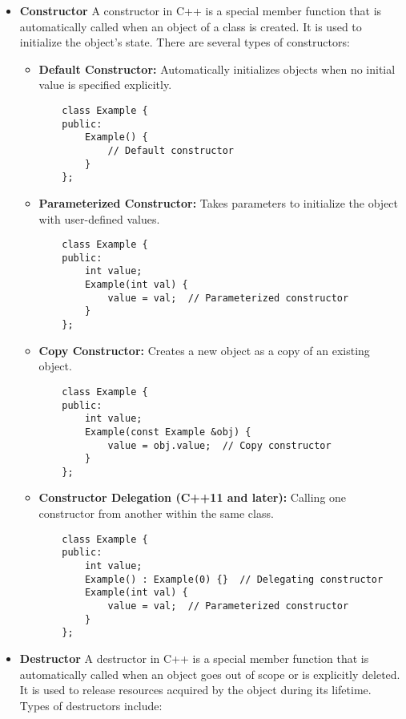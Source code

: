 \begin{itemize}
\item \textbf{Constructor} A constructor in C++ is a special member function that is automatically called when an object of a class is created. It is used to initialize the object's state. There are several types of constructors:
\begin{itemize}
    \item \textbf{Default Constructor:} Automatically initializes objects when no initial value is specified explicitly.
    \begin{tcolorbox}[title=Default Constructor]
    \begin{verbatim}
    class Example {
    public:
        Example() {
            // Default constructor
        }
    };
    \end{verbatim}
    \end{tcolorbox}
    
    \item \textbf{Parameterized Constructor:} Takes parameters to initialize the object with user-defined values.
    \begin{tcolorbox}[title=Parameterized Constructor]
    \begin{verbatim}
    class Example {
    public:
        int value;
        Example(int val) {
            value = val;  // Parameterized constructor
        }
    };
    \end{verbatim}
    \end{tcolorbox}
    
    \item \textbf{Copy Constructor:} Creates a new object as a copy of an existing object.
    \begin{tcolorbox}[title=Copy Constructor]
    \begin{verbatim}
    class Example {
    public:
        int value;
        Example(const Example &obj) {
            value = obj.value;  // Copy constructor
        }
    };
    \end{verbatim}
    \end{tcolorbox}
    
    \item \textbf{Constructor Delegation (C++11 and later):} Calling one constructor from another within the same class.
    \begin{tcolorbox}[title=Constructor Delegation]
    \begin{verbatim}
    class Example {
    public:
        int value;
        Example() : Example(0) {}  // Delegating constructor
        Example(int val) {
            value = val;  // Parameterized constructor
        }
    };
    \end{verbatim}
    \end{tcolorbox}
\end{itemize}
\item \textbf{Destructor} A destructor in C++ is a special member function that is automatically called when an object goes out of scope or is explicitly deleted. It is used to release resources acquired by the object during its lifetime. Types of destructors include:


\end{itemize}
